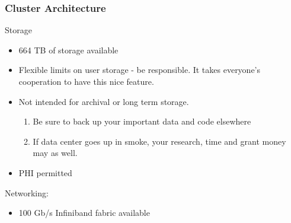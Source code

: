 \documentclass{beamer}
\begin{document}
\begin{frame}
\frametitle{Cluster Architecture}
Storage 
\begin{itemize}
    \item 664 TB of storage available
    \pause
    \item Flexible limits on user storage - be responsible.
          It takes everyone's cooperation to have this nice feature.
    \pause
    \item Not intended for archival or long term storage.
        \begin{enumerate}
              \item Be sure to back up your important data and code elsewhere
              \pause
              \item If data center goes up in smoke, your research, time and grant money may as well.
        \end{enumerate}
    \pause
    \item PHI permitted
\end{itemize}
\pause
Networking:
\begin{itemize}
    \item 100 Gb/s Infiniband fabric available
\end{itemize}
\end{frame}
\end{document}
